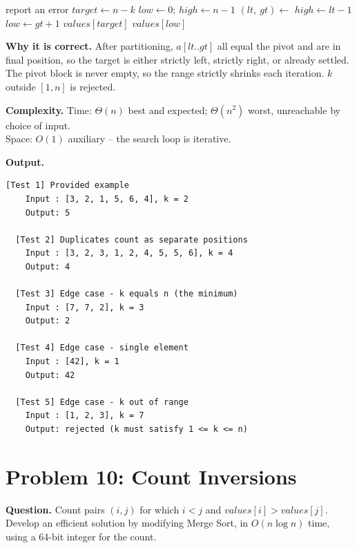 \documentclass[11pt]{article}
\begin{document}
\begin{algorithm}[H]
\caption{Kth Largest Element (Quickselect)}
\begin{algorithmic}[1]
        \State report an error
    \EndIf
    \State $target \gets n - k$ 
    \State $low \gets 0$; \quad $high \gets n - 1$
        \State $(lt,\ gt) \gets$ 
            \State $high \gets lt - 1$
            \State $low \gets gt + 1$
        \Else
            \State \Return $values[target]$ 
        \EndIf
    \EndWhile
    \State \Return $values[low]$
\EndFunction
\end{algorithmic}
\end{algorithm}

\textbf{Why it is correct.} After partitioning, $a[lt..gt]$ all equal the pivot and are in final position, so the target is either strictly left, strictly right, or already settled. The pivot block is never empty, so the range strictly shrinks each iteration. $k$ outside $[1,n]$ is rejected.

\textbf{Complexity.} Time: $\Theta(n)$ best and expected; $\Theta(n^2)$ worst, unreachable by choice of input.\\
Space: $O(1)$ auxiliary -- the search loop is iterative.

\textbf{Output.}

\begin{lstlisting}[style=term]
  [Test 1] Provided example
    Input : [3, 2, 1, 5, 6, 4], k = 2
    Output: 5

  [Test 2] Duplicates count as separate positions
    Input : [3, 2, 3, 1, 2, 4, 5, 5, 6], k = 4
    Output: 4

  [Test 3] Edge case - k equals n (the minimum)
    Input : [7, 7, 2], k = 3
    Output: 2

  [Test 4] Edge case - single element
    Input : [42], k = 1
    Output: 42

  [Test 5] Edge case - k out of range
    Input : [1, 2, 3], k = 7
    Output: rejected (k must satisfy 1 <= k <= n)
\end{lstlisting}

\newpage

\section*{Problem 10: Count Inversions}
\textbf{Question.} Count pairs $(i,j)$ for which $i<j$ and $values[i] > values[j]$. Develop an efficient solution by modifying Merge Sort, in $O(n\log n)$ time, using a 64-bit integer for the count.
\end{document}
